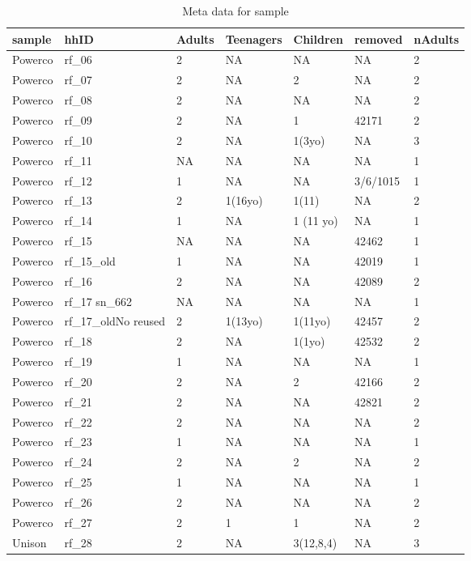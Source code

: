 \documentclass[]{article}
\begin{document}
\begin{table}

\caption{\label{tab:load metadata}Meta data for sample}
\centering
\begin{tabular}[t]{l|l|l|l|l|l|l}
\hline
sample & hhID & Adults & Teenagers & Children & removed & nAdults\\
\hline
Powerco & rf\_06 & 2 & NA & NA & NA & 2\\
\hline
Powerco & rf\_07 & 2 & NA & 2 & NA & 2\\
\hline
Powerco & rf\_08 & 2 & NA & NA & NA & 2\\
\hline
Powerco & rf\_09 & 2 & NA & 1 & 42171 & 2\\
\hline
Powerco & rf\_10 & 2 & NA & 1(3yo) & NA & 3\\
\hline
Powerco & rf\_11 & NA & NA & NA & NA & 1\\
\hline
Powerco & rf\_12 & 1 & NA & NA & 3/6/1015 & 1\\
\hline
Powerco & rf\_13 & 2 & 1(16yo) & 1(11) & NA & 2\\
\hline
Powerco & rf\_14 & 1 & NA & 1 (11 yo) & NA & 1\\
\hline
Powerco & rf\_15 & NA & NA & NA & 42462 & 1\\
\hline
Powerco & rf\_15\_old & 1 & NA & NA & 42019 & 1\\
\hline
Powerco & rf\_16 & 2 & NA & NA & 42089 & 2\\
\hline
Powerco & rf\_17 sn\_662 & NA & NA & NA & NA & 1\\
\hline
Powerco & rf\_17\_oldNo reused & 2 & 1(13yo) & 1(11yo) & 42457 & 2\\
\hline
Powerco & rf\_18 & 2 & NA & 1(1yo) & 42532 & 2\\
\hline
Powerco & rf\_19 & 1 & NA & NA & NA & 1\\
\hline
Powerco & rf\_20 & 2 & NA & 2 & 42166 & 2\\
\hline
Powerco & rf\_21 & 2 & NA & NA & 42821 & 2\\
\hline
Powerco & rf\_22 & 2 & NA & NA & NA & 2\\
\hline
Powerco & rf\_23 & 1 & NA & NA & NA & 1\\
\hline
Powerco & rf\_24 & 2 & NA & 2 & NA & 2\\
\hline
Powerco & rf\_25 & 1 & NA & NA & NA & 1\\
\hline
Powerco & rf\_26 & 2 & NA & NA & NA & 2\\
\hline
Powerco & rf\_27 & 2 & 1 & 1 & NA & 2\\
\hline
Unison & rf\_28 & 2 & NA & 3(12,8,4) & NA & 3\\

\end{tabular}
\end{table}
\end{document}
